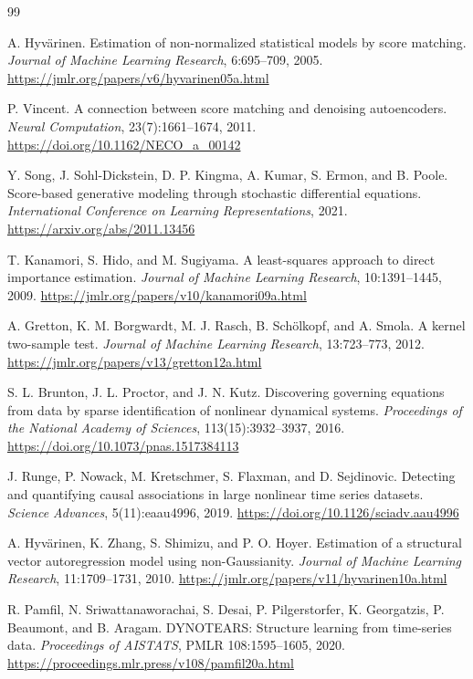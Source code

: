 \documentclass[10pt]{article}
\begin{document}
\begin{thebibliography}{99}

A. Hyv\"arinen.
Estimation of non-normalized statistical models by score matching.
\emph{Journal of Machine Learning Research}, 6:695--709, 2005.
\url{https://jmlr.org/papers/v6/hyvarinen05a.html}

P. Vincent.
A connection between score matching and denoising autoencoders.
\emph{Neural Computation}, 23(7):1661--1674, 2011.
\url{https://doi.org/10.1162/NECO_a_00142}

Y. Song, J. Sohl-Dickstein, D. P. Kingma, A. Kumar, S. Ermon, and B. Poole.
Score-based generative modeling through stochastic differential equations.
\emph{International Conference on Learning Representations}, 2021.
\url{https://arxiv.org/abs/2011.13456}

T. Kanamori, S. Hido, and M. Sugiyama.
A least-squares approach to direct importance estimation.
\emph{Journal of Machine Learning Research}, 10:1391--1445, 2009.
\url{https://jmlr.org/papers/v10/kanamori09a.html}

A. Gretton, K. M. Borgwardt, M. J. Rasch, B. Sch\"olkopf, and A. Smola.
A kernel two-sample test.
\emph{Journal of Machine Learning Research}, 13:723--773, 2012.
\url{https://jmlr.org/papers/v13/gretton12a.html}

S. L. Brunton, J. L. Proctor, and J. N. Kutz.
Discovering governing equations from data by sparse identification of nonlinear dynamical systems.
\emph{Proceedings of the National Academy of Sciences}, 113(15):3932--3937, 2016.
\url{https://doi.org/10.1073/pnas.1517384113}

J. Runge, P. Nowack, M. Kretschmer, S. Flaxman, and D. Sejdinovic.
Detecting and quantifying causal associations in large nonlinear time series datasets.
\emph{Science Advances}, 5(11):eaau4996, 2019.
\url{https://doi.org/10.1126/sciadv.aau4996}

A. Hyv\"arinen, K. Zhang, S. Shimizu, and P. O. Hoyer.
Estimation of a structural vector autoregression model using non-Gaussianity.
\emph{Journal of Machine Learning Research}, 11:1709--1731, 2010.
\url{https://jmlr.org/papers/v11/hyvarinen10a.html}

R. Pamfil, N. Sriwattanaworachai, S. Desai, P. Pilgerstorfer, K. Georgatzis, P. Beaumont, and B. Aragam.
DYNOTEARS: Structure learning from time-series data.
\emph{Proceedings of AISTATS}, PMLR 108:1595--1605, 2020.
\url{https://proceedings.mlr.press/v108/pamfil20a.html}


\end{thebibliography}
\end{document}
